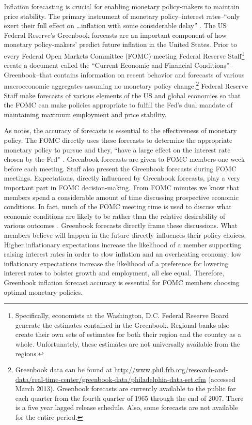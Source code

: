 \documentclass[a4paper]{article}\usepackage[]{graphicx}\usepackage[]{color}
\begin{document}
Inflation forecasting is crucial for enabling monetary policy-makers to maintain price stability. The primary instrument of monetary policy--interest rates--``only exert their full effect on \ldots inflation with some considerable delay'' \citep[59]{Goodhart2001}. The US Federal Reserve's Greenbook forecasts are an important component of how monetary policy-makers' predict future inflation in the United States. Prior to every Federal Open Markets Committee (FOMC) meeting Federal Reserve Staff\footnote{Specifically, economists at the Washington, D.C. Federal Reserve Board generate the estimates contained in the Greenbook. Regional banks also create their own sets of estimates for both their region and the country as a whole. Unfortunately, these estimates are not universally available from the regions.} create a document called the ``Current Economic and Financial Conditions''--Greenbook--that contains information on recent behavior and forecasts of various macroeconomic aggregates assuming no monetary policy change.\footnote{Greenbook data can be found at {\url{http://www.phil.frb.org/research-and-data/real-time-center/greenbook-data/philadelphia-data-set.cfm}} (accessed March 2013). Greenbook forecasts are currently available to the public for each quarter from the fourth quarter of 1965 through the end of 2007. There is a five year lagged release schedule. Also, some forecasts are not available for the entire period.} Federal Reserve Staff make forecasts of various elements of the US and global economies so that the FOMC can make policies appropriate to fulfill the Fed's dual mandate of maintaining maximum employment and price stability. 

As \cite{Svensson2005} notes, the accuracy of forecasts is essential to the effectiveness of monetary policy. The FOMC directly uses these forecasts to determine the appropriate monetary policy to pursue and they, ``have a large effect on the interest rate chosen by the Fed'' \citep[130]{Adolph2013}. Greenbook forecasts are given to FOMC members one week before each meeting. Staff also present the Greenbook forecasts during FOMC meetings. Expectations, directly influenced by Greenbook forecasts, play a very important part in FOMC decision-making. From FOMC minutes we know that members spend a considerable amount of time discussing prospective economic conditions. In fact, much of the FOMC meeting time is used to discuss what economic conditions are likely to be rather than the relative desirability of various outcomes \citep[230]{RomerRomer2008}. Greenbook forecasts directly frame these discussions. What members believe will happen in the future directly influences their policy choices. Higher inflationary expectations increase the likelihood of a member supporting raising interest rates in order to slow inflation and an overheating economy; low inflationary expectations increase the likelihood of a preference for lowering interest rates to bolster growth and employment, all else equal. Therefore, Greenbook inflation forecast accuracy is essential for FOMC members choosing optimal monetary policies.
\end{document}
